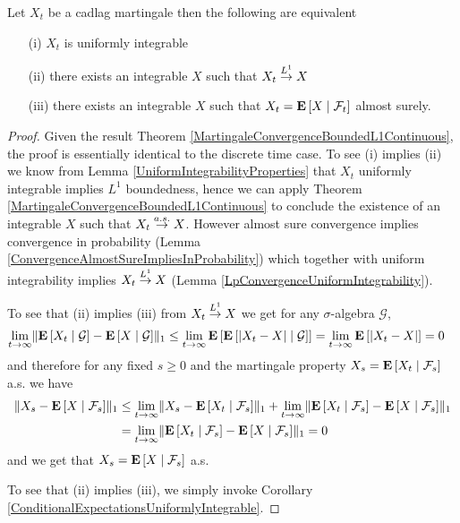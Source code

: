 \begin{thm}\label{L1MartingaleConvergenceTheoremContinuous}Let $X_t$ be
  a cadlag martingale then the following are equivalent
\begin{itemize}
\item[(i)]$X_t$ is uniformly
  integrable
\item[(ii)]there exists an integrable $X$  such that
  $X_t \tolp{1} X$
\item[(iii)]there exists an integrable $X$ such that
  $X_t = \cexpectationlong{\mathcal{F}_t}{X}$ almost surely.
\end{itemize}
\end{thm}
\begin{proof}
Given the result Theorem
\ref{MartingaleConvergenceBoundedL1Continuous}, the proof is
essentially identical to the discrete time case.  
To see (i) implies (ii) we know from Lemma
\ref{UniformIntegrabilityProperties} that $X_t$ uniformly integrable
implies $L^1$ boundedness, hence we can apply Theorem
\ref{MartingaleConvergenceBoundedL1Continuous}
to conclude the existence of an integrable $X$ such that $X_t \toas
X$.  However almost sure convergence implies convergence in
probability (Lemma \ref{ConvergenceAlmostSureImpliesInProbability})
which together with uniform integrability implies $X_t \tolp{1} X$
(Lemma \ref{LpConvergenceUniformIntegrability}).

To see that (ii) implies (iii) from $X_t \tolp{1} X$ we get for any
$\sigma$-algebra $\mathcal{G}$,
\begin{align*}
\lim_{t \to \infty}
\norm{\cexpectationlong{\mathcal{G}}{X_t}
    -\cexpectationlong{\mathcal{G}}{X} }_1 &\leq
\lim_{t \to \infty}\expectation{\cexpectationlong{\mathcal{G}}{\abs{
      X_t- X}}} = \lim_{t \to \infty}\expectation{\abs{X_t -X}} = 0
\end{align*}
and therefore for any fixed $s \geq 0$ and the martingale property
$X_s = \cexpectationlong{\mathcal{F}_s}{X_t}$ a.s. we have
\begin{align*}
\norm{X_s - \cexpectationlong{\mathcal{F}_s}{X}}_1 &\leq \lim_{t \to
  \infty} \norm{X_s -
  \cexpectationlong{\mathcal{F}_s}{X_t}}_1  + \lim_{t \to
  \infty} \norm{\cexpectationlong{\mathcal{F}_s}{X_t}-
  \cexpectationlong{\mathcal{F}_s}{X}}_1 \\
&= \lim_{t \to
  \infty} \norm{\cexpectationlong{\mathcal{F}_s}{X_t}-
  \cexpectationlong{\mathcal{F}_s}{X}}_1=0
\end{align*}
and we get that $X_s = \cexpectationlong{\mathcal{F}_s}{X}$ a.s.

To see that (ii) implies (iii), we simply invoke Corollary \ref{ConditionalExpectationsUniformlyIntegrable}.
\end{proof}

